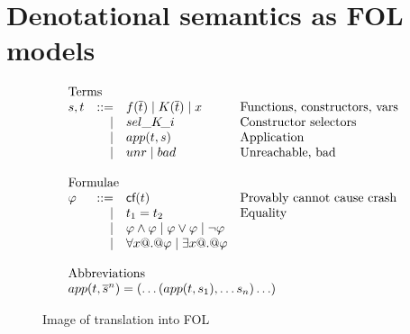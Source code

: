 \documentclass[preprint,nocopyrightspace,draft]{sigplanconf}
\begin{document}

\section{Denotational semantics as FOL models} 
\newcommand{\linterp}[1]{{\cal I}(#1)}
\newcommand{\lassign}[1]{\mu(#1)}


\begin{figure}
\[\begin{array}{c} 
\begin{array}{lrll}
\multicolumn{3}{l}{\text{Terms}} \\
  s,t & ::=  & f(\ol{t}) \mid K(\ol{t}) \mid x & \text{Functions, constructors, vars} \\
      & \mid & \sel{K}{i}                      & \text{Constructor selectors} \\ 
      & \mid & app(t,s)                        & \text{Application} \\
      & \mid & \unr \mid \bad                  & \text{Unreachable, bad} \\ \\ 
\multicolumn{3}{l}{\text{Formulae}} \\ 
 \phi & ::=  & \lcf{t}    & \text{Provably cannot cause crash} \\
      & \mid & t_1 = t_2  & \text{Equality} \\ 
      & \mid & \phi \land \phi \mid \phi \lor \phi \mid \neg \phi \\
      & \mid & \forall x @.@ \phi \mid \exists x @.@ \phi \\ \\ 
\multicolumn{3}{l}{\text{Abbreviations}} \\ 
\multicolumn{4}{l}{app(t,\oln{s}{n}) = (\ldots(app(t,s_1),\ldots s_n)\ldots)}
\end{array}
\end{array}\]
\caption{Image of translation into FOL}\label{fig:fol-image}
\end{figure}

\newcommand{\elab}[1]{\rightsquigarrow \formula{#1}}
\end{document}
